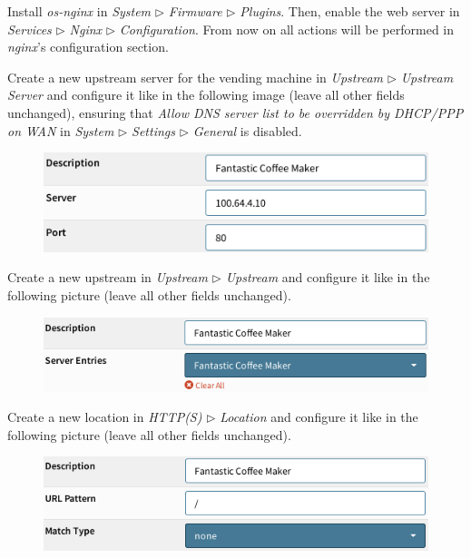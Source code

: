 \documentclass[draft]{homework}
\begin{document}
    Install \textit{os-nginx} in \textit{System} $\triangleright$ \textit{Firmware} $\triangleright$ \textit{Plugins}.
    Then, enable the web server in \textit{Services} $\triangleright$ \textit{Nginx} $\triangleright$ \textit{Configuration}.
    From now on all actions will be performed in \textit{nginx}'s configuration section.
    
    Create a new upstream server for the vending machine in \textit{Upstream} $\triangleright$ \textit{Upstream Server} and configure it like in the following image (leave all other fields unchanged), ensuring that \textit{Allow DNS server list to be overridden by DHCP/PPP on WAN } in \textit{System} $\triangleright$ \textit{Settings} $\triangleright$ \textit{General} is disabled.
    \vspace{-5pt}
    \begin{figure}[H]
        \centering
        \includegraphics[width=\linewidth]{images/upstream-server}
        \label{fig:upstream-server}
    \end{figure}
    \vspace{-20pt}
    
    Create a new upstream in \textit{Upstream} $\triangleright$ \textit{Upstream} and configure it like in the following picture (leave all other fields unchanged).
    \vspace{-5pt}
    \begin{figure}[H]
        \centering
        \includegraphics[width=1\linewidth]{images/upstream}
        \label{fig:upstream}
    \end{figure}
    \vspace{-20pt}
    
    Create a new location in \textit{HTTP(S)} $\triangleright$ \textit{Location} and configure it like in the following picture (leave all other fields unchanged).
    \vspace{-5pt}
    \begin{figure}[H]
        \centering
        \includegraphics[width=1\linewidth]{images/location}
        \label{fig:location}
    \end{figure}
    \vspace{-20pt}
    
\end{document}

